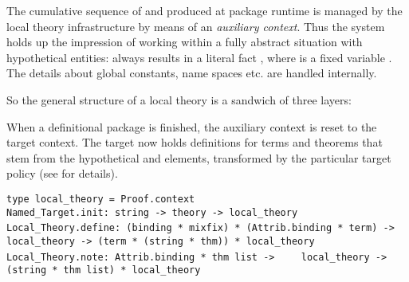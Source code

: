 \begin{isabellebody}
\begin{isamarkuptext}
  The cumulative sequence of  and 
  produced at package runtime is managed by the local theory
  infrastructure by means of an \emph{auxiliary context}.  Thus the
  system holds up the impression of working within a fully abstract
  situation with hypothetical entities: 
  always results in a literal fact , where
   is a fixed variable .  The details about
  global constants, name spaces etc. are handled internally.

  So the general structure of a local theory is a sandwich of three
  layers:

  \begin{center}
  \end{center}

  When a definitional package is finished, the auxiliary context is
  reset to the target context.  The target now holds definitions for
  terms and theorems that stem from the hypothetical  and  elements, transformed by the
  particular target policy (see \cite[\S4--5]{Haftmann-Wenzel:2009}
  for details).%
\end{isamarkuptext}%
\isamarkuptrue%
%
\isadelimmlref
%
\endisadelimmlref
%
\isatagmlref
%
\begin{isamarkuptext}%
\begin{mldecls}
  \verb|type local_theory = Proof.context| \\
  \verb|Named_Target.init: string -> theory -> local_theory| \\[1ex]
  \verb|Local_Theory.define: (binding * mixfix) * (Attrib.binding * term) ->|\isasep\isanewline%
\verb|    local_theory -> (term * (string * thm)) * local_theory| \\
  \verb|Local_Theory.note: Attrib.binding * thm list ->|\isasep\isanewline%
\verb|    local_theory -> (string * thm list) * local_theory| \\
  \end{mldecls}


\end{isamarkuptext}
\end{isabellebody}
